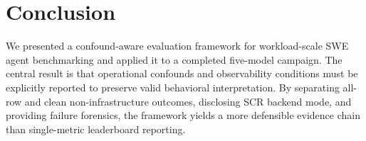 \documentclass[11pt]{article}
\begin{document}
\section{Conclusion}
We presented a confound-aware evaluation framework for workload-scale SWE agent benchmarking and applied it to a completed five-model campaign. The central result is that operational confounds and observability conditions must be explicitly reported to preserve valid behavioral interpretation. By separating all-row and clean non-infrastructure outcomes, disclosing SCR backend mode, and providing failure forensics, the framework yields a more defensible evidence chain than single-metric leaderboard reporting.

\appendix




\end{document}
